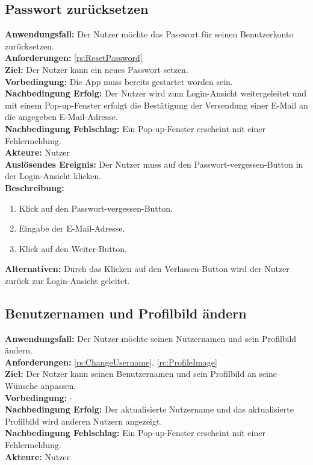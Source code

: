 \documentclass[parskip=full]{scrartcl}
\begin{document}
\subsection{Passwort zurücksetzen}
\textbf{Anwendungsfall:} Der Nutzer möchte das Passwort für seinen Benutzerkonto zurücksetzen.\\
\textbf{Anforderungen:} \ref{rs:ResetPassword}\\
\textbf{Ziel:} Der Nutzer kann ein neues Passwort setzen.\\
\textbf{Vorbedingung:} Die App muss bereits gestartet worden sein.\\
\textbf{Nachbedingung Erfolg:} Der Nutzer wird zum Login-Ansicht weitergeleitet und mit einem Pop-up-Fenster erfolgt die Bestätigung der Versendung einer E-Mail an die angegeben E-Mail-Adresse.\\
\textbf{Nachbedingung Fehlschlag:} Ein Pop-up-Fenster erscheint mit einer Fehlermeldung.\\
\textbf{Akteure:} Nutzer\\
\textbf{Auslösendes Ereignis:} Der Nutzer muss auf den Passwort-vergessen-Button in der Login-Ansicht klicken.\\
\textbf{Beschreibung:}
\begin{enumerate}
    \item Klick auf den Passwort-vergessen-Button.
    \item Eingabe der E-Mail-Adresse.
    \item Klick auf den Weiter-Button.
\end{enumerate}
\textbf{Alternativen:} Durch das Klicken auf den Verlassen-Button wird der Nutzer zurück zur Login-Ansicht geleitet.
\newpage


\subsection{Benutzernamen und Profilbild ändern}
\textbf{Anwendungsfall:} Der Nutzer möchte seinen Nutzernamen und sein Profilbild ändern.\\
\textbf{Anforderungen:} \ref{rs:ChangeUsername}, \ref{rc:ProfileImage}\\
\textbf{Ziel:} Der Nutzer kann seinen Benutzernamen und sein Profilbild an seine Wünsche anpassen.\\
\textbf{Vorbedingung:} -\\
\textbf{Nachbedingung Erfolg:} Der aktualisierte Nutzername und das aktualisierte Profilbild wird anderen Nutzern angezeigt.\\
\textbf{Nachbedingung Fehlschlag:} Ein Pop-up-Fenster erscheint mit einer Fehlermeldung.\\
\textbf{Akteure:} Nutzer\\
\end{document}
